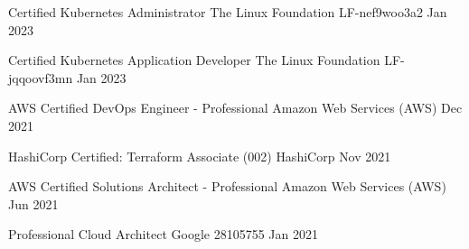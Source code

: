 

\begin{cvhonors}

  \cvhonor
    {Certified Kubernetes Administrator} %
    {The Linux Foundation} %
    {LF-nef9woo3a2} %
    {Jan 2023} %

  \cvhonor
    {Certified Kubernetes Application Developer} %
    {The Linux Foundation} %
    {LF-jqqoovf3mn} %
    {Jan 2023} %

  \cvhonor
    {AWS Certified DevOps Engineer - Professional} %
    {Amazon Web Services (AWS)} %
    {} %
    {Dec 2021} %

\cvhonor
{HashiCorp Certified: Terraform Associate (002)} %
{HashiCorp} %
{} %
{Nov 2021} %

  \cvhonor
    {AWS Certified Solutions Architect - Professional} %
    {Amazon Web Services (AWS)} %
    {} %
    {Jun 2021} %

\cvhonor
{Professional Cloud Architect} %
{Google} %
{28105755} %
{Jan 2021} %

\end{cvhonors}
